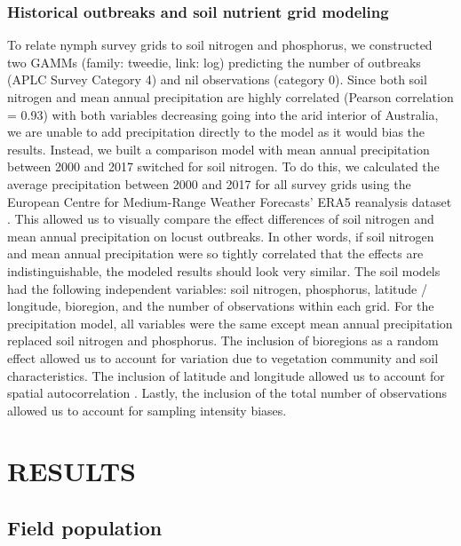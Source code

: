 \documentclass[
]{article}
\begin{document}
\subsubsection{Historical outbreaks and soil nutrient grid
modeling}\label{historical-outbreaks-and-soil-nutrient-grid-modeling}

To relate nymph survey grids to soil nitrogen and phosphorus, we
constructed two GAMMs (family: tweedie, link: log) predicting the number
of outbreaks (APLC Survey Category 4) and nil observations (category 0).
Since both soil nitrogen and mean annual precipitation are highly
correlated (Pearson correlation = 0.93) with both variables decreasing
going into the arid interior of Australia, we are unable to add
precipitation directly to the model as it would bias the results.
Instead, we built a comparison model with mean annual precipitation
between 2000 and 2017 switched for soil nitrogen. To do this, we
calculated the average precipitation between 2000 and 2017 for all
survey grids using the European Centre for Medium-Range Weather
Forecasts' ERA5 reanalysis dataset \citep{munoz-sabater_era5-land_2021}.
This allowed us to visually compare the effect differences of soil
nitrogen and mean annual precipitation on locust outbreaks. In other
words, if soil nitrogen and mean annual precipitation were so tightly
correlated that the effects are indistinguishable, the modeled results
should look very similar. The soil models had the following independent
variables: soil nitrogen, phosphorus, latitude / longitude, bioregion,
and the number of observations within each grid. For the precipitation
model, all variables were the same except mean annual precipitation
replaced soil nitrogen and phosphorus. The inclusion of bioregions as a
random effect allowed us to account for variation due to vegetation
community and soil characteristics. The inclusion of latitude and
longitude allowed us to account for spatial autocorrelation
\citep{clayton_spatial_1993}. Lastly, the inclusion of the total number
of observations allowed us to account for sampling intensity biases.

\section{RESULTS}\label{results}

\subsection{Field population}\label{field-population-1}
\end{document}
